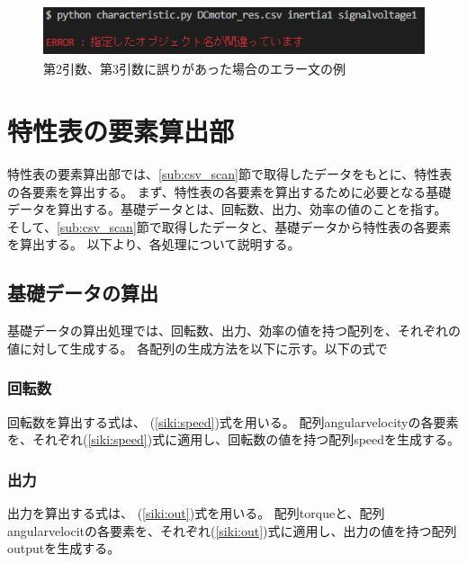 \begin{figure}[t]
	\centering
	\includegraphics[width=12cm,height=1.5cm]{./Image/error_comand.png}
	\caption{第2引数、第3引数に誤りがあった場合のエラー文の例}
	\label{fig:error_comand}
\end{figure}

\section{特性表の要素算出部}\label{youso_sec}
特性表の要素算出部では、\ref{sub:csv_scan}節で取得したデータをもとに、特性表の各要素を算出する。
まず、特性表の各要素を算出するために必要となる基礎データを算出する。基礎データとは、回転数、出力、効率の値のことを指す。
そして、\ref{sub:csv_scan}節で取得したデータと、基礎データから特性表の各要素を算出する。
以下より、各処理について説明する。

\subsection{基礎データの算出}\label{sub:youso_kiso}
基礎データの算出処理では、回転数、出力、効率の値を持つ配列を、それぞれの値に対して生成する。
各配列の生成方法を以下に示す。以下の式で

\subsubsection{回転数}\label{sub:sub:kaiten}
回転数を算出する式は、%
(\ref{siki:speed})式を用いる。
配列angularvelocityの各要素を、それぞれ(\ref{siki:speed})式に適用し、回転数の値を持つ配列speedを生成する。

\subsubsection{出力}\label{sub:sub:syutu}
出力を算出する式は、%
(\ref{siki:out})式を用いる。
配列torqueと、配列angularvelocitの各要素を、それぞれ(\ref{siki:out})式に適用し、出力の値を持つ配列outputを生成する。
